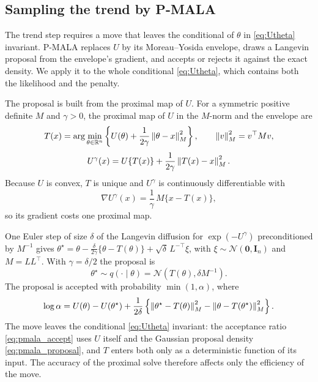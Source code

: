 \subsection{Sampling the trend by P-MALA}
\label{subsec:pmala}

The trend step requires a move that leaves the conditional of $\theta$ in \eqref{eq:Utheta} invariant. P-MALA \citep{pereyra2016proximal} replaces $U$ by its Moreau--Yosida envelope, draws a Langevin proposal from the envelope's gradient, and accepts or rejects it against the exact density. We apply it to the whole conditional \eqref{eq:Utheta}, which contains both the likelihood and the penalty.

The proposal is built from the proximal map of $U$. For a symmetric positive definite $M$ and $\gamma > 0$, the proximal map of $U$ in the $M$-norm and the envelope are
\begin{equation}
    T(x) = \arg\min_{\theta \in \mathbb{R}^n} \left\{ U(\theta) + \frac{1}{2\gamma}\left\lVert\theta - x\right\rVert_M^2 \right\}, \qquad \left\lVert v\right\rVert_M^2 = v^\top M v ,
    \label{eq:prox}
\end{equation}
\begin{equation}
    U^\gamma(x) = U\{T(x)\} + \frac{1}{2\gamma}\left\lVert T(x) - x\right\rVert_M^2 .
    \label{eq:envelope}
\end{equation}
Because $U$ is convex, $T$ is unique and $U^\gamma$ is continuously differentiable with
\begin{equation}
    \nabla U^\gamma(x) = \frac{1}{\gamma}\, M\{x - T(x)\},
    \label{eq:envelope_grad}
\end{equation}
so its gradient costs one proximal map.

One Euler step of size $\delta$ of the Langevin diffusion for $\exp(-U^\gamma)$ preconditioned by $M^{-1}$ gives $\theta^\star = \theta - \frac{\delta}{2\gamma}\{\theta - T(\theta)\} + \sqrt{\delta}\, L^{-\top}\xi$, with $\xi \sim \mathcal{N}(\mathbf{0}, \mathbf{I}_n)$ and $M = L L^\top$. With $\gamma = \delta/2$ \citep{pereyra2016proximal} the proposal is
\begin{equation}
    \theta^\star \sim q(\cdot \mid \theta) = \mathcal{N}\!\left(T(\theta), \delta M^{-1}\right).
    \label{eq:pmala_proposal}
\end{equation}
The proposal is accepted with probability $\min(1,\alpha)$, where
\begin{equation}
    \log \alpha = U(\theta) - U(\theta^\star) + \frac{1}{2\delta}\left\{ \left\lVert\theta^\star - T(\theta)\right\rVert_M^2 - \left\lVert\theta - T(\theta^\star)\right\rVert_M^2 \right\}.
    \label{eq:pmala_accept}
\end{equation}
The move leaves the conditional \eqref{eq:Utheta} invariant: the acceptance ratio \eqref{eq:pmala_accept} uses $U$ itself and the Gaussian proposal density \eqref{eq:pmala_proposal}, and $T$ enters both only as a deterministic function of its input. The accuracy of the proximal solve therefore affects only the efficiency of the move.

